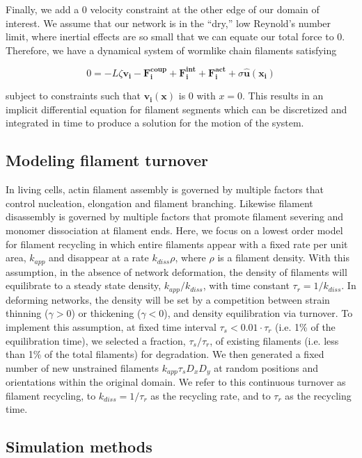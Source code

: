 Finally, we add a 0 velocity constraint at the other edge of our domain of interest.  We assume that our network is in the ``dry,'' low Reynold's number limit, where inertial effects are so small that we can equate our total force to 0.  Therefore, we have a dynamical system of wormlike chain filaments satisfying

\begin{equation}
\label{eqn:systfull}
0=-L\zeta\mathbf{ v_i} -\mathbf{F^{coup}_i}+ \mathbf{F^{int}_i}+\mathbf{F^{act}_i} + \sigma\mathbf{\hat{u}(x_i)}
\end{equation}

subject to constraints such that $\mathbf{v_i(x)}$ is 0 with $x=0$.  This results in an implicit differential equation for filament segments which can be discretized and integrated in time to produce a solution for the motion of the system.


\subsection{Modeling filament turnover}

In living cells, actin filament assembly is governed by multiple factors that control nucleation, elongation and filament branching. Likewise filament disassembly is governed by multiple factors that promote filament severing and monomer dissociation at filament ends. Here, we focus on a lowest order model for filament recycling in which entire filaments appear with a fixed rate per unit area, $k_{app}$ and disappear at a rate $k_{diss}\rho$, where $\rho$ is a filament density. With this assumption, in the absence of network deformation, the density of filaments will equilibrate to a steady state density, $k_{app}/k_{diss}$, with time constant $\tau_r = 1/k_{diss}$.   In deforming networks, the density will be set by a competition between strain thinning ($\gamma>0$) or thickening ($\gamma<0$), and density equilibration via turnover. To implement this assumption, at fixed time interval $\tau_s < 0.01\cdot\tau_r$ (i.e. 1\% of the equilibration time), we selected a fraction, $\tau_s/\tau_r$, of existing filaments (i.e. less than 1\% of the total filaments) for degradation. We then generated a fixed number of new unstrained filaments $k_{app}\tau_sD_xD_y$ at random positions and orientations within the original domain.   We refer to this continuous turnover as filament recycling, to $k_{diss}=1/\tau_r$ as the recycling rate, and to $\tau_r$ as the recycling time.


\subsection{Simulation methods}

